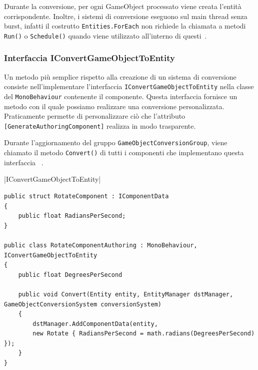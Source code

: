 Durante la conversione, per ogni GameObject processato viene creata l'entità corrispondente.
Inoltre, i sistemi di conversione eseguono sul main thread senza burst, infatti il costrutto \verb|Entities.ForEach| non richiede la chiamata a metodi \verb|Run()| o \verb|Schedule()| quando viene utilizzato all'interno di questi~\cite{doc:unity-entities-api}.

\subsubsection{Interfaccia IConvertGameObjectToEntity}
Un metodo più semplice rispetto alla creazione di un sistema di conversione consiste nell'implementare l'interfaccia \verb|IConvertGameObjectToEntity| nella classe del \verb|MonoBehaviour| contenente il componente. Questa interfaccia fornisce un metodo con il quale possiamo realizzare una conversione personalizzata. Praticamente permette di personalizzare ciò che l'attributo \verb|[GenerateAuthoringComponent]| realizza in modo trasparente.

Durante l'aggiornamento del gruppo \verb|GameObjectConversionGroup|, viene chiamato il metodo \verb|Convert()| di tutti i componenti che implementano questa interfaccia ~\cite{doc:unity-entities-manual}.

|IConvertGameObjectToEntity|

\begin{lstlisting}[caption={Esempio di conversione personalizzata tramite l'utilizzo dell'interfaccia \UseVerb{IConvertGameObjectToEntityTerm}~\cite{youtube:conversione-dati-scene-dots}.}, label={lst:convert-example}, language={[Sharp]C}]
public struct RotateComponent : IComponentData
{
	public float RadiansPerSecond;
}

public class RotateComponentAuthoring : MonoBehaviour, IConvertGameObjectToEntity
{
	public float DegreesPerSecond

	public void Convert(Entity entity, EntityManager dstManager, GameObjectConversionSystem conversionSystem)
	{
		dstManager.AddComponentData(entity, 
		new Rotate { RadiansPerSecond = math.radians(DegreesPerSecond) });
	}
}
\end{lstlisting}


